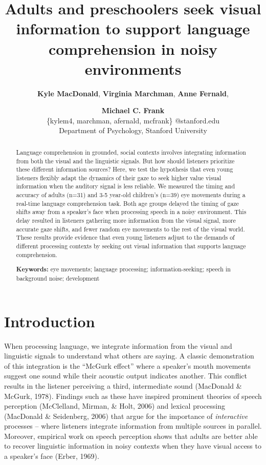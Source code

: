 \documentclass[10pt, letterpaper]{article}
\title{Adults and preschoolers seek visual information to support language
comprehension in noisy environments}
\author{{\large \bf Kyle MacDonald}, {\large \bf Virginia Marchman}, {\large \bf Anne Fernald}, \and {\large \bf Michael C. Frank} \\ \{kylem4, marchman, afernald, mcfrank\} @stanford.edu \\ Department of Psychology, Stanford University}
\begin{document}
\maketitle

\begin{abstract}
Language comprehension in grounded, social contexts involves integrating
information from both the visual and the linguistic signals. But how
should listeners prioritize these different information sources? Here,
we test the hypothesis that even young listeners flexibly adapt the
dynamics of their gaze to seek higher value visual information when the
auditory signal is less reliable. We measured the timing and accuracy of
adults (n=31) and 3-5 year-old children's (n=39) eye movements during a
real-time language comprehension task. Both age groups delayed the
timing of gaze shifts away from a speaker's face when processing speech
in a noisy environment. This delay resulted in listeners gathering more
information from the visual signal, more accurate gaze shifts, and fewer
random eye movements to the rest of the visual world. These results
provide evidence that even young listeners adjust to the demands of
different processing contexts by seeking out visual information that
supports language comprehension.

\textbf{Keywords:}
eye movements; language processing; information-seeking; speech in
background noise; development
\end{abstract}

\hypertarget{introduction}{%
\section{Introduction}\label{introduction}}

When processing language, we integrate information from the visual and
linguistic signals to understand what others are saying. A classic
demonstration of this integration is the ``McGurk effect'' where a
speaker's mouth movements suggest one sound while their acoustic output
indicates another. This conflict results in the listener perceiving a
third, intermediate sound (MacDonald \& McGurk, 1978). Findings such as
these have inspired prominent theories of speech perception (McClelland,
Mirman, \& Holt, 2006) and lexical processing (MacDonald \& Seidenberg,
2006) that argue for the importance of \emph{interactive} processes --
where listeners integrate information from multiple sources in parallel.
Moreover, empirical work on speech perception shows that adults are
better able to recover linguistic information in noisy contexts when
they have visual access to a speaker's face (Erber, 1969).
\end{document}
